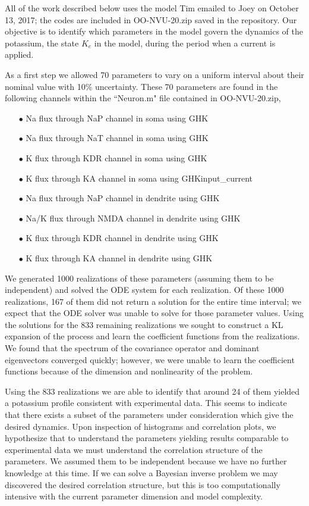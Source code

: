 \documentclass{article}
\begin{document}
All of the work described below uses the model Tim emailed to Joey on October 13, 2017; the codes are included in OO-NVU-20.zip saved in the repository. Our objective is to identify which parameters in the model govern the dynamics of the potassium, the state $K_e$ in the model, during the period when a current is applied.

As a first step we allowed 70 parameters to vary on a uniform interval about their nominal value with 10\% uncertainty. These 70 parameters are found in the following channels within the ``Neuron.m" file contained in OO-NVU-20.zip,
\begin{enumerate}
\item[$\bullet$] Na flux through NaP channel in soma using GHK
\item[$\bullet$] Na flux through NaT channel in soma using GHK
\item[$\bullet$] K flux through KDR channel in soma using GHK
\item[$\bullet$] K flux through KA channel in soma using GHKinput\_current
\item[$\bullet$] Na flux through NaP channel in dendrite using GHK
\item[$\bullet$] Na/K flux through NMDA channel in dendrite using GHK
\item[$\bullet$] K flux through KDR channel in dendrite using GHK
\item[$\bullet$] K flux through KA channel in dendrite using GHK
\end{enumerate}

We generated 1000 realizations of these parameters (assuming them to be independent) and solved the ODE system for each realization. Of these 1000 realizations, 167 of them did not return a solution for the entire time interval; we expect that the ODE solver was unable to solve for those parameter values. Using the solutions for the 833 remaining realizations we sought to construct a KL expansion of the process and learn the coefficient functions from the realizations. We found that the spectrum of the covariance operator and dominant eigenvectors converged quickly; however, we were unable to learn the coefficient functions because of the dimension and nonlinearity of the problem.

Using the 833 realizations we are able to identify that around 24 of them yielded a potassium profile consistent with experimental data. This seems to indicate that there exists a subset of the parameters under consideration which give the desired dynamics. Upon inspection of histograms and correlation plots, we hypothesize that to understand the parameters yielding results comparable to experimental data we must understand the correlation structure of the parameters. We assumed them to be independent because we have no further knowledge at this time. If we can solve a Bayesian inverse problem we may discovered the desired correlation structure, but this is too computationally intensive with the current parameter dimension and model complexity. 
\end{document}
